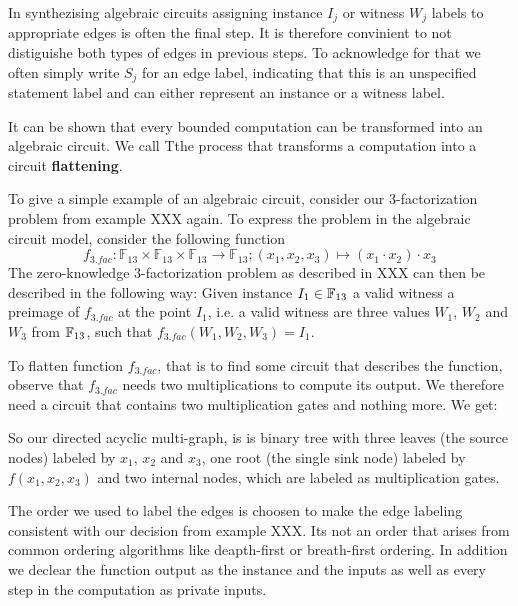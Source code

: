 \begin{notation}
In synthezising algebraic circuits assigning instance $I_j$ or witness $W_j$ labels to appropriate edges is often the final step. It is therefore convinient to not distiguishe both types of edges in previous steps. To acknowledge for that we often simply write $S_j$ for an edge label, indicating that this is an unspecified statement label and can either represent an instance or a witness label. 
\end{notation}
It can be shown that every bounded computation can be transformed into an algebraic circuit. We call Tthe process that transforms a computation into a circuit \textbf{flattening}.
\begin{example} To give a simple example of an algebraic circuit, consider our $3$-factorization problem from example XXX again.  To express the problem in the algebraic circuit model, consider the following function 
\[
f_{3.fac}:\mathbb{F}_{13}\times\mathbb{F}_{13}\times\mathbb{F}_{13}\to\mathbb{F}_{13};(x_{1},x_{2},x_{3})\mapsto(x_{1}\cdot x_{2})\cdot x_{3}
\]
The zero-knowledge $3$-factorization problem as described in XXX can then be described in the following way: Given instance $I_1\in \mathbb{F}_{13}$ a valid witness a preimage of $f_{3.fac}$ at the point $I_1$, i.e. a valid witness are three values $W_1$, $W_2$ and $W_3$ from $\mathbb{F}_{13}$, such that $f_{3.fac}(W_1,W_2,W_3)=I_1$. 

To flatten function $f_{3.fac}$, that is to find some circuit that describes the function, observe that $f_{3.fac}$ needs two multiplications to compute its output. We therefore need a circuit that contains two multiplication gates and nothing more. We get:

\begin{center}
\end{center}
So our directed acyclic multi-graph, is is binary tree with three leaves (the source nodes) labeled by $x_1$, $x_2$ and $x_3$, one root (the single sink node) labeled by $f(x_1,x_2,x_3)$ and two internal nodes, which are labeled as multiplication gates. 

The order we used to label the edges is choosen to make the edge labeling consistent with our decision from example XXX. Its not an order that arises from common ordering algorithms like deapth-first or breath-first ordering. In addition we declear the function output as the instance and the inputs as well as every step in the computation as private inputs.
\end{example}
